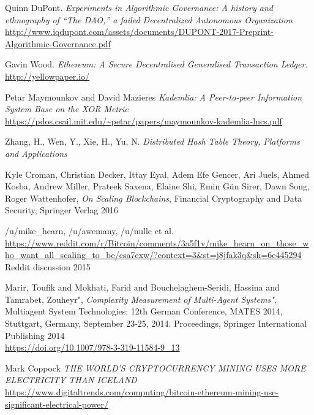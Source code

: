 \documentclass[twocolumn,showpacs,%
  nofootinbib,aps,superscriptaddress,%
  eqsecnum,prd,notitlepage,showkeys,10pt]{revtex4-1}
\begin{document}

\begin{thebibliography}{9}

Quinn DuPont.
\textit{Experiments in Algorithmic Governance: A history and ethnography of “The DAO,” a failed Decentralized Autonomous Organization}
\\\url{http://www.iqdupont.com/assets/documents/DUPONT-2017-Preprint-Algorithmic-Governance.pdf}

Gavin Wood.
\textit{Ethereum: A Secure Decentralised Generalised Transaction Ledger}.
\\\url{http://yellowpaper.io/}

Petar Maymounkov and David Mazieres
\textit{Kademlia: A Peer-to-peer Information System Base on the XOR Metric}
\\\url{https://pdos.csail.mit.edu/~petar/papers/maymounkov-kademlia-lncs.pdf}

Zhang, H., Wen, Y., Xie, H., Yu, N.
\textit{
Distributed Hash Table
Theory, Platforms and Applications}

Kyle Croman, Christian Decker, Ittay Eyal, Adem Efe Gencer, Ari Juels, Ahmed Kosba, Andrew Miller, Prateek Saxena, Elaine Shi, Emin Gün Sirer, Dawn Song, Roger Wattenhofer,
\textit{On Scaling Blockchains},
Financial Cryptography and Data Security,
Springer Verlag 2016

/u/mike\_hearn, /u/awemany, /u/nullc et al.
\\\url{https://www.reddit.com/r/Bitcoin/comments/3a5f1v/mike_hearn_on_those_who_want_all_scaling_to_be/csa7exw/?context=3&st=j8jfak3q&sh=6e445294}
Reddit discussion
2015

Marir, Toufik and Mokhati, Farid and Bouchelaghem-Seridi, Hassina and Tamrabet, Zouheyr",
\textit{Complexity Measurement of Multi-Agent Systems"},
Multiagent System Technologies: 12th German Conference, MATES 2014, Stuttgart, Germany, September 23-25, 2014. Proceedings,
Springer International Publishing
2014
\\\url{https://doi.org/10.1007/978-3-319-11584-9_13}

Mark Coppock
\textit{THE WORLD’S CRYPTOCURRENCY MINING USES MORE ELECTRICITY THAN ICELAND}
\\\url{https://www.digitaltrends.com/computing/bitcoin-ethereum-mining-use-significant-electrical-power/}


\end{thebibliography}
\end{document}
